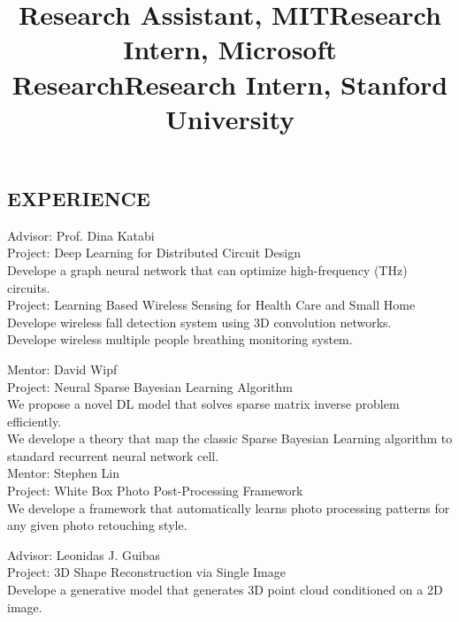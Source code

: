\documentclass[margin]{res}
\newcommand{\Bullet}[1]{{\raisebox{0.25ex}{\tiny$\bullet$\ }}{#1}\\}
\begin{document}
\begin{resume}
\section{EXPERIENCE}
\title{\textbf{Research Assistant, MIT}}
\begin{position}
    Advisor: Prof. Dina Katabi \\
    Project: Deep Learning for Distributed Circuit Design \\
    \Bullet{Develope a graph neural network that can optimize high-frequency (THz) circuits.}

    \vspace{-7mm}
    Project: Learning Based Wireless Sensing for Health Care and Small Home \\
    \Bullet{Develope wireless fall detection system using 3D convolution networks.}
    \Bullet{Develope wireless multiple people breathing monitoring system.}
\end{position}
\vspace{-5mm}

\title{\textbf{Research Intern, Microsoft Research}}
\begin{position}
    Mentor: David Wipf \\
    Project: Neural Sparse Bayesian Learning Algorithm \\
    \Bullet{We propose a novel DL model that solves sparse matrix inverse problem efficiently.}
    \Bullet{We develope a theory that map the classic Sparse Bayesian Learning algorithm to standard recurrent neural network cell.}

    \vspace{-7mm}
    Mentor: Stephen Lin \\
    Project: White Box Photo Post-Processing Framework \\
    \Bullet{We develope a framework that automatically learns photo processing patterns for any given photo retouching style.}
\end{position}
\vspace{-5mm}

\title{\textbf{Research Intern, Stanford University}}
\begin{position}
    Advisor: Leonidas J. Guibas \\
    Project: 3D Shape Reconstruction via Single Image \\
    \Bullet{Develope a generative model that generates 3D point cloud conditioned on a 2D image.}
\end{position}
\vspace{-5mm}


\end{resume}
\end{document}
